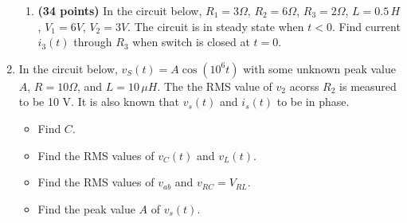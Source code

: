 \begin{enumerate}
\begin{enumerate}
\item  {\bf (34 points)} 
  In the circuit below, $R_1=3\Omega$, $R_2=6\Omega$, $R_3=2\Omega$, 
  $L=0.5\,H$, $V_1=6V$, $V_2=3V$. The circuit is in steady state when 
  $t<0$. Find current $i_3(t)$ through $R_3$ when switch is closed at
  $t=0$.


  \begin{comment}
  {\bf Solution:} Current through $L$ at $t=0$ is
  \[
  i_L(0^-)=i_L(0^+)=3/6=0.5\,A
  \]
  We have $\tau=L/(R_1||R_2||R_3)=0.5/(3||6||2)=0.5\,s$ and $i_3(\infty)=0$.
  To find $i_3(0^+)$ after the switch is closed at $t=0$, we use 
  superposition
  \begin{itemize}
  \item $V_1=6V$ alone: Total current through $V_1$:
    \[
    \frac{V_1}{R_1+R_2||R_3}=\frac{6}{3+1.5}=\frac{4}{3}
    \]
    By current divider:
    \[
    i'_3(0^+)=\frac{4}{3}\;\frac{2}{2+6}=\frac{4\times 6}{3\times 8}=1\;\;\;\;\;\mbox{(down)}
    \]
  \item $V_2$ alone: 
    \[
    i''_3(0^+)=\frac{V_2}{R_1||R_2+R_3}=\frac{3}{2+2}=\frac{3}{4}=0.75\;\;\;\;\;\mbox{(down)}
    \]
  \item $i_L(0^+)$ alone:
    \[
    i'''_3(0^+)=i_L(0^+)\frac{R_1||R_2}{R_3+R_1||R_2}=0.5\frac{2}{2+2}=0.25\;\;\;\;\;\mbox{(up)}
    \]
  \end{itemize}
  \[
  i_3(0^+)=i'_3(0^+)+i''_3(0^+)+i'''_3(0^+)=1+0.75-0.25=1.5\,A
  \]
  \[
  i_3(t)=0-(1.5-0)e^{-t/\tau}=1.5e^{-2t}\,A
  \]

  Alternative method: $i_L(0)=0.5\,A$, applying KCL to the middle point a:
  \[
  \frac{V_a}{R_3}+\frac{V_a-V_1-V_2}{R_1}+\frac{V_a-V_2}{R_2}+i_L
  =\frac{V_a}{2}+\frac{V_a-9}{3}+\frac{V_a-3}{6}+0.5=0
  \]
  Solving this we get $V_a=3\,V$, and $i_3(0^+)=V_a/R_3=3/2=1.5\,A$, same
  as above.
  \end{comment}

\end{enumerate}





\item In the circuit below, $v_S(t)=A\cos(10^6 t)$ with some unknown
  peak value $A$, $R=10\Omega$, and $L=10\,\mu H$. The the RMS value
  of $v_2$ acorss $R_2$ is measured to be 10 V. It is also known that
  $v_s(t)$ and $i_s(t)$ to be in phase. 
  \begin{itemize}
  \item Find $C$.
  \item Find the RMS values of $v_C(t)$ and $v_L(t)$.
  \item Find the RMS values of $v_{ab}$ and $v_{RC}=V_{RL}$.
  \item Find the peak value $A$ of $v_s(t)$.
  \end{itemize}


\end{enumerate}
